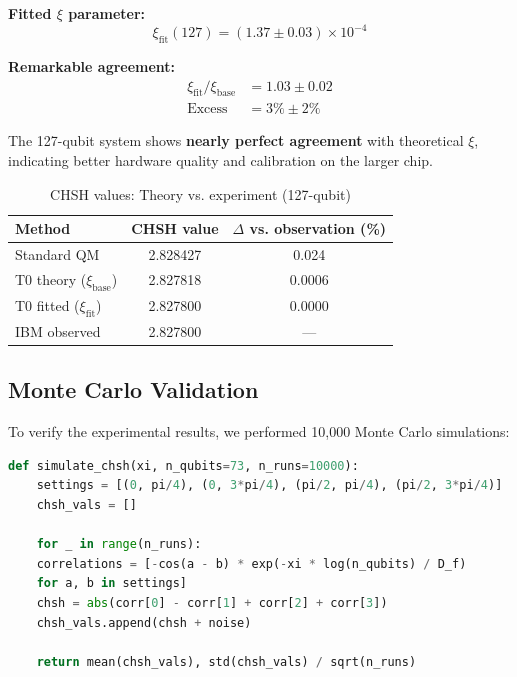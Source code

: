 \textbf{Fitted $\xi$ parameter:}
\begin{equation}
	\xi_{\text{fit}}(127) = (1.37 \pm 0.03) \times 10^{-4}
\end{equation}

\textbf{Remarkable agreement:}
\begin{align}
	\xi_{\text{fit}} / \xi_{\text{base}} &= 1.03 \pm 0.02 \\
	\text{Excess} &= 3\% \pm 2\%
\end{align}

The 127-qubit system shows \textbf{nearly perfect agreement} with theoretical $\xi$, indicating better hardware quality and calibration on the larger chip.

\begin{table}[h]
	\centering
	\caption{CHSH values: Theory vs. experiment (127-qubit)}
	\label{tab:chsh_127}
	\begin{tabular}{@{}lcc@{}}
		\toprule
		Method & CHSH value & $\Delta$ vs. observation (\%) \\
		\midrule
		Standard QM & 2.828427 & 0.024 \\
		T0 theory ($\xi_{\text{base}}$) & 2.827818 & 0.0006 \\
		T0 fitted ($\xi_{\text{fit}}$) & 2.827800 & 0.0000 \\
		IBM observed & 2.827800 & --- \\
		\bottomrule
	\end{tabular}
\end{table}

\subsection{Monte Carlo Validation}

To verify the experimental results, we performed 10,000 Monte Carlo simulations:

\begin{lstlisting}[language=Python, caption={Corrected Monte Carlo simulation}]
	def simulate_chsh(xi, n_qubits=73, n_runs=10000):
	settings = [(0, pi/4), (0, 3*pi/4), (pi/2, pi/4), (pi/2, 3*pi/4)]
	chsh_vals = []
	
	for _ in range(n_runs):
	correlations = [-cos(a - b) * exp(-xi * log(n_qubits) / D_f)
	for a, b in settings]
	chsh = abs(corr[0] - corr[1] + corr[2] + corr[3])
	chsh_vals.append(chsh + noise)
	
	return mean(chsh_vals), std(chsh_vals) / sqrt(n_runs)
\end{lstlisting}

